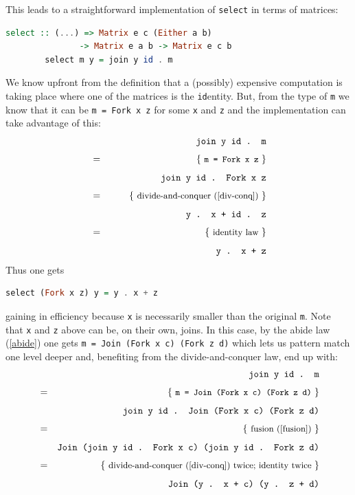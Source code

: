 \documentclass[
  oneside,
  11pt, a4paper,
  footinclude=true,
  headinclude=true,
  cleardoublepage=empty
]{scrbook}
\theoremstyle{definition}
\theoremstyle{definition}
\def\start{&&}
\def\just#1#2{\\ &#1& \rule{2em}{0pt} \{ \mbox{\rule[-.7em]{0pt}{1.8em} \small #2 \/} \} \nonumber\\ && }
\begin{document}
        This leads to a straightforward implementation of \texttt{select} in terms of matrices:
        
        \begin{lstlisting}[language=Haskell, caption={\texttt{select} in terms of matrices},captionpos=b]
        select :: (...) => Matrix e c (Either a b) 
               -> Matrix e a b -> Matrix e c b
        select m y = join y id . m
        \end{lstlisting}{}
        
        We know upfront from the definition that a (possibly) expensive computation is taking place where one of the matrices is the \texttt{id}entity. But, from the type of \texttt{m} we know that it can be \texttt{m = Fork x z} for some \texttt{x} and \texttt{z} and the implementation can take advantage of this: \small
        \begin{eqnarray*}
        \start
            \texttt{join y id . m}
        \just={\texttt{m = Fork x z}}
            \texttt{join y id . Fork x z}
        \just={ divide-and-conquer (\ref{div-conq}) }
            \texttt{y . x + id . z}
        \just={ identity law }
            \texttt{y . x + z}
        \end{eqnarray*}\normalsize
        Thus one gets
        \begin{lstlisting}[language=Haskell, caption={\texttt{Fork x z} pattern match case},captionpos=b]
        select (Fork x z) y = y . x + z
        \end{lstlisting}{}
        gaining in efficiency because \texttt{x} is necessarily smaller than the original \texttt{m}.
        Note that \texttt{x} and \texttt{z} above can be, on their own, joins. In this case, by the abide law (\ref{abide}) one gets \texttt{m = Join (Fork x c) (Fork z d)} which lets us pattern match one level deeper and, benefiting from the divide-and-conquer law, end up with: \small
        \begin{eqnarray*}
        \start
            \texttt{join y id . m}
        \just={\texttt{m = Join (Fork x c) (Fork z d)}}
            \texttt{join y id . Join (Fork x c) (Fork z d)}
        \just={ fusion (\ref{fusion}) }
            \texttt{Join (join y id . Fork x c) (join y id . Fork z d)}
        \just={ divide-and-conquer  (\ref{div-conq}) twice; identity twice }
            \texttt{Join (y . x + c) (y . z + d)}
        \end{eqnarray*}\normalsize
        
\end{document}
